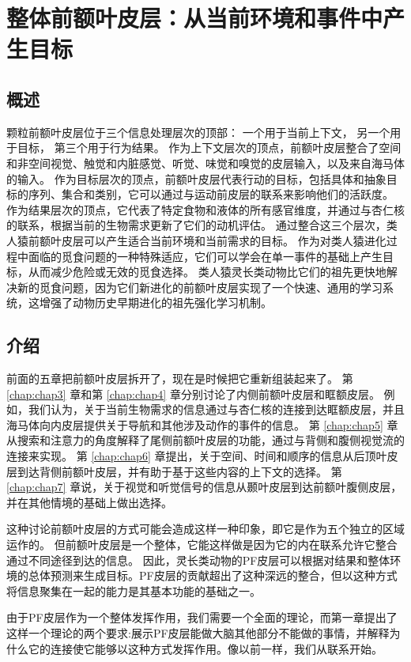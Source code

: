 \chapter{整体前额叶皮层：从当前环境和事件中产生目标} \label{chap:chap8}

\section{概述}

颗粒前额叶皮层位于三个信息处理层次的顶部：
一个用于当前上下文，
另一个用于目标，
第三个用于行为结果。
作为上下文层次的顶点，前额叶皮层整合了空间和非空间视觉、触觉和内脏感觉、听觉、味觉和嗅觉的皮层输入，以及来自海马体的输入。
作为目标层次的顶点，前额叶皮层代表行动的目标，包括具体和抽象目标的序列、集合和类别，它可以通过与运动前皮层的联系来影响他们的活跃度。
作为结果层次的顶点，它代表了特定食物和液体的所有感官维度，并通过与杏仁核的联系，根据当前的生物需求更新了它们的动机评估。
通过整合这三个层次，类人猿前额叶皮层可以产生适合当前环境和当前需求的目标。
作为对类人猿进化过程中面临的觅食问题的一种特殊适应，它们可以学会在单一事件的基础上产生目标，从而减少危险或无效的觅食选择。
类人猿灵长类动物比它们的祖先更快地解决新的觅食问题，因为它们新进化的前额叶皮层实现了一个快速、通用的学习系统，这增强了动物历史早期进化的祖先强化学习机制。



\section{介绍}
\par

前面的五章把前额叶皮层拆开了，现在是时候把它重新组装起来了。
第 \ref{chap:chap3} 章和第 \ref{chap:chap4} 章分别讨论了内侧前额叶皮层和眶额皮层。
例如，我们认为，关于当前生物需求的信息通过与杏仁核的连接到达眶额皮层，并且海马体向内皮层提供关于导航和其他涉及动作的事件的信息。
第 \ref{chap:chap5} 章从搜索和注意力的角度解释了尾侧前额叶皮层的功能，通过与背侧和腹侧视觉流的连接来实现。
第 \ref{chap:chap6} 章提出，关于空间、时间和顺序的信息从后顶叶皮层到达背侧前额叶皮层，并有助于基于这些内容的上下文的选择。
第 \ref{chap:chap7} 章说，关于视觉和听觉信号的信息从颞叶皮层到达前额叶腹侧皮层，并在其他情境的基础上做出选择。
\par


这种讨论前额叶皮层的方式可能会造成这样一种印象，即它是作为五个独立的区域运作的。
但前额叶皮层是一个整体，它能这样做是因为它的内在联系允许它整合通过不同途径到达的信息。
因此，灵长类动物的PF皮层可以根据对结果和整体环境的总体预测来生成目标。PF皮层的贡献超出了这种深远的整合，但以这种方式将信息聚集在一起的能力是其基本功能的基础之一。
\par
由于PF皮层作为一个整体发挥作用，我们需要一个全面的理论，而第一章提出了这样一个理论的两个要求:展示PF皮层能做大脑其他部分不能做的事情，并解释为什么它的连接使它能够以这种方式发挥作用。像以前一样，我们从联系开始。

